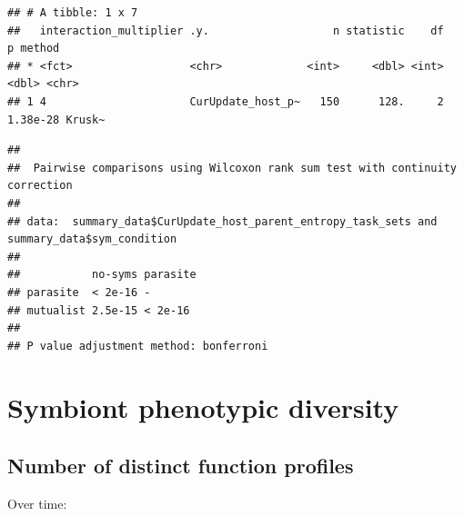 \documentclass[
]{book}
\newenvironment{Shaded}{\begin{snugshade}}{\end{snugshade}}
\newcommand{\AttributeTok}[1]{\textcolor[rgb]{0.77,0.63,0.00}{#1}}
\newcommand{\ConstantTok}[1]{\textcolor[rgb]{0.00,0.00,0.00}{#1}}
\newcommand{\FunctionTok}[1]{\textcolor[rgb]{0.00,0.00,0.00}{#1}}
\newcommand{\NormalTok}[1]{#1}
\newcommand{\SpecialCharTok}[1]{\textcolor[rgb]{0.00,0.00,0.00}{#1}}
\newcommand{\StringTok}[1]{\textcolor[rgb]{0.31,0.60,0.02}{#1}}
\begin{document}
\begin{verbatim}
## # A tibble: 1 x 7
##   interaction_multiplier .y.                   n statistic    df        p method
## * <fct>                  <chr>             <int>     <dbl> <int>    <dbl> <chr> 
## 1 4                      CurUpdate_host_p~   150      128.     2 1.38e-28 Krusk~
\end{verbatim}

\begin{Shaded}
\end{Shaded}

\begin{verbatim}
## 
##  Pairwise comparisons using Wilcoxon rank sum test with continuity correction 
## 
## data:  summary_data$CurUpdate_host_parent_entropy_task_sets and summary_data$sym_condition 
## 
##           no-syms parasite
## parasite  < 2e-16 -       
## mutualist 2.5e-15 < 2e-16 
## 
## P value adjustment method: bonferroni
\end{verbatim}

\hypertarget{symbiont-phenotypic-diversity}{%
\section{Symbiont phenotypic diversity}\label{symbiont-phenotypic-diversity}}

\hypertarget{number-of-distinct-function-profiles-1}{%
\subsection{Number of distinct function profiles}\label{number-of-distinct-function-profiles-1}}

Over time:
\end{document}
